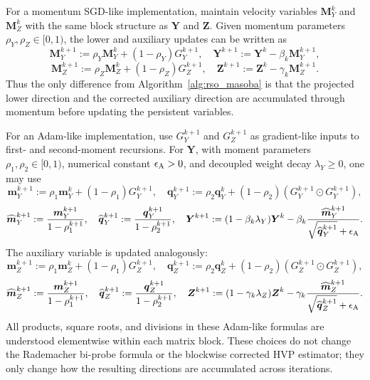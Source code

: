 \documentclass{pkumelon}
\theoremstyle{plain}
\begin{document}
For a momentum SGD-like implementation, maintain velocity variables $\boldsymbol M_Y^k$ and $\boldsymbol M_Z^k$ with the same block structure as $\boldsymbol Y$ and $\boldsymbol Z$. Given momentum parameters $\rho_Y,\rho_Z\in[0,1)$, the lower and auxiliary updates can be written as
\begin{equation*}
\boldsymbol M_Y^{k+1}:=\rho_Y\boldsymbol M_Y^k+(1-\rho_Y)G_Y^{k+1}, \quad \boldsymbol Y^{k+1}:=\boldsymbol Y^k-\beta_k\boldsymbol M_Y^{k+1},
\end{equation*}
\begin{equation*}
\boldsymbol M_Z^{k+1}:=\rho_Z\boldsymbol M_Z^k+(1-\rho_Z)G_Z^{k+1}, \quad \boldsymbol Z^{k+1}:=\boldsymbol Z^k-\gamma_k\boldsymbol M_Z^{k+1}.
\end{equation*}
Thus the only difference from Algorithm~\ref{alg:rso_masoba} is that the projected lower direction and the corrected auxiliary direction are accumulated through momentum before updating the persistent variables.

For an Adam-like implementation, use $G_Y^{k+1}$ and $G_Z^{k+1}$ as gradient-like inputs to first- and second-moment recursions. For $\boldsymbol Y$, with moment parameters $\rho_1,\rho_2\in[0,1)$, numerical constant $\epsilon_{\rm A}>0$, and decoupled weight decay $\lambda_Y\ge0$, one may use
\begin{equation*}
\boldsymbol m_Y^{k+1}:=\rho_1\boldsymbol m_Y^k+(1-\rho_1)G_Y^{k+1}, \quad \boldsymbol q_Y^{k+1}:=\rho_2\boldsymbol q_Y^k+(1-\rho_2)(G_Y^{k+1}\odot G_Y^{k+1}),
\end{equation*}
\begin{equation*}
\widehat{\boldsymbol m}_Y^{k+1}:=\frac{\boldsymbol m_Y^{k+1}}{1-\rho_1^{k+1}}, \quad \widehat{\boldsymbol q}_Y^{k+1}:=\frac{\boldsymbol q_Y^{k+1}}{1-\rho_2^{k+1}}, \quad \boldsymbol Y^{k+1}:=(1-\beta_k\lambda_Y)\boldsymbol Y^k-\beta_k\frac{\widehat{\boldsymbol m}_Y^{k+1}}{\sqrt{\widehat{\boldsymbol q}_Y^{k+1}}+\epsilon_{\rm A}}.
\end{equation*}
The auxiliary variable is updated analogously:
\begin{equation*}
\boldsymbol m_Z^{k+1}:=\rho_1\boldsymbol m_Z^k+(1-\rho_1)G_Z^{k+1}, \quad \boldsymbol q_Z^{k+1}:=\rho_2\boldsymbol q_Z^k+(1-\rho_2)(G_Z^{k+1}\odot G_Z^{k+1}),
\end{equation*}
\begin{equation*}
\widehat{\boldsymbol m}_Z^{k+1}:=\frac{\boldsymbol m_Z^{k+1}}{1-\rho_1^{k+1}}, \quad \widehat{\boldsymbol q}_Z^{k+1}:=\frac{\boldsymbol q_Z^{k+1}}{1-\rho_2^{k+1}}, \quad \boldsymbol Z^{k+1}:=(1-\gamma_k\lambda_Z)\boldsymbol Z^k-\gamma_k\frac{\widehat{\boldsymbol m}_Z^{k+1}}{\sqrt{\widehat{\boldsymbol q}_Z^{k+1}}+\epsilon_{\rm A}}.
\end{equation*}
All products, square roots, and divisions in these Adam-like formulas are understood elementwise within each matrix block. These choices do not change the Rademacher bi-probe formula or the blockwise corrected HVP estimator; they only change how the resulting directions are accumulated across iterations.
\end{document}
